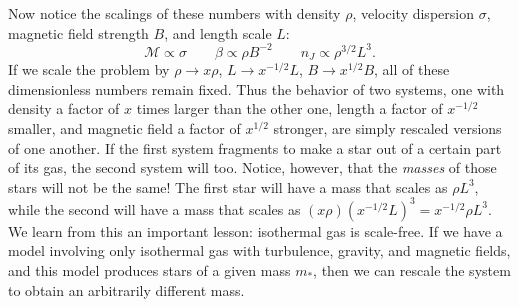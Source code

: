 Now notice the scalings of these numbers with density $\rho$, velocity dispersion $\sigma$, magnetic field strength $B$, and length scale $L$:
\begin{equation}
\mathcal{M} \propto \sigma
\qquad
\beta \propto \rho B^{-2}
\qquad
n_J \propto \rho^{3/2} L^3.
\end{equation}
If we scale the problem by $\rho\rightarrow x \rho$, $L\rightarrow x^{-1/2} L$, $B\rightarrow x^{1/2} B$, all of these dimensionless numbers remain fixed. Thus the behavior of two systems, one with density a factor of $x$ times larger than the other one, length a factor of $x^{-1/2}$ smaller, and magnetic field a factor of $x^{1/2}$ stronger, are simply rescaled versions of one another. If the first system fragments to make a star out of a certain part of its gas, the second system will too. Notice, however, that the {\it masses} of those stars will not be the same! The first star will have a mass that scales as $\rho L^3$, while the second will have a mass that scales as $(x\rho) (x^{-1/2} L)^3 = x^{-1/2} \rho L^3$. We learn from this an important lesson: isothermal gas is scale-free. If we have a model involving only isothermal gas with turbulence, gravity, and magnetic fields, and this model produces stars of a given mass $m_*$, then we can rescale the system to obtain an arbitrarily different mass.

